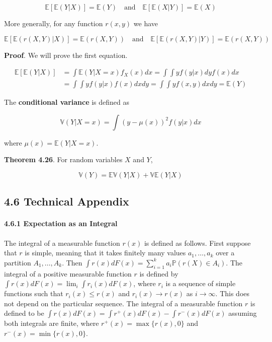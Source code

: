 \[ \mathbb{E}[\mathbb{E}(Y | X)] = \mathbb{E}(Y)
\quad \text{and} \quad
\mathbb{E}[\mathbb{E}(X | Y)] = \mathbb{E}(X) \]

More generally, for any function \(r(x, y)\) we have

\[ \mathbb{E}[\mathbb{E}(r(X, Y) | X)] = \mathbb{E}(r(X, Y))
\quad \text{and} \quad
\mathbb{E}[\mathbb{E}(r(X, Y) | Y)] = \mathbb{E}(r(X, Y)) \]

\textbf{Proof}. We will prove the first equation.

\begin{align}
\mathbb{E}[\mathbb{E}(Y | X)] &= \int \mathbb{E}(Y | X = x) f_X(x) dx = \int \int y f(y | x) dy f(x) dx \\
&= \int \int y f(y|x) f(x) dx dy = \int \int y f(x, y) dx dy = \mathbb{E}(Y)
\end{align}

The \textbf{conditional variance} is defined as

\[ \mathbb{V}(Y | X = x) = \int (y - \mu(x))^2 f(y | x) dx \]

where \(\mu(x) = \mathbb{E}(Y | X = x)\).

\textbf{Theorem 4.26}. For random variables \(X\) and \(Y\),

\[ \mathbb{V}(Y) = \mathbb{E}\mathbb{V}(Y | X) + \mathbb{V} \mathbb{E} (Y | X)\]

\subsection{4.6 Technical Appendix}\label{technical-appendix}

\paragraph{4.6.1 Expectation as an
Integral}\label{expectation-as-an-integral}

The integral of a measurable function \(r(x)\) is defined as follows.
First suppose that \(r\) is simple, meaning that it takes finitely many
values \(a_1, \dots, a_k\) over a partition \(A_1, \dots, A_k\). Then
\(\int r(x) dF(x) = \sum_{i=1}^k a_i \mathbb{P}(r(X) \in A_i)\). The
integral of a positive measurable function \(r\) is defined by
\(\int r(x) dF(x) = \lim_i \int r_i(x) dF(x)\), where \(r_i\) is a
sequence of simple functions such that \(r_i(x) \leq r(x)\) and
\(r_i(x) \rightarrow r(x)\) as \(i \rightarrow \infty\). This does not
depend on the particular sequence. The integral of a measurable function
\(r\) is defined to be
\(\int r(x) dF(x) = \int r^+(x) dF(x) - \int r^-(x) dF(x)\) assuming
both integrals are finite, where \(r^+(x) = \max \{ r(x), 0 \}\) and
\(r^-(x) = \min\{ r(x), 0 \}\).

